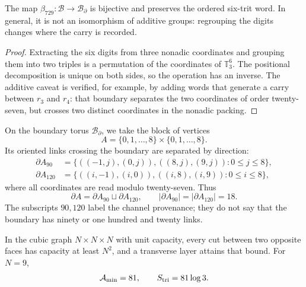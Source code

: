 \begin{proposition}
\label{rm:prop:modular-beta729}
The map \(\beta_{729}:\mathcal B\to\mathcal B_\partial\) is bijective and
preserves the ordered six-trit word. In general, it is not an
isomorphism of additive groups: regrouping the digits changes where the
carry is recorded.
\end{proposition}

\begin{proof}
Extracting the six digits from three nonadic coordinates and grouping them into
two triples is a permutation of the coordinates of \(\mathbb T_3^6\). The
positional decomposition is unique on both sides, so the
operation has an inverse. The additive caveat is verified, for example,
by adding words that generate a carry between \(r_3\) and \(r_4\): that
boundary separates the two coordinates of order twenty-seven, but crosses
two distinct coordinates in the nonadic packing.
\end{proof}

On the boundary torus \(\mathcal B_\partial\), we take the block of vertices
\begin{equation}
\label{rm:eq:modular-block-A}
A=\{0,1,\ldots,8\}\times\{0,1,\ldots,8\}.
\end{equation}
Its oriented links crossing the boundary are separated by direction:
\begin{align}
\partial A_{90}
&=\{((-1,j),(0,j)),((8,j),(9,j)):0\leq j\leq8\},
\label{rm:eq:modular-boundary90}\\
\partial A_{120}
&=\{((i,-1),(i,0)),((i,8),(i,9)):0\leq i\leq8\},
\label{rm:eq:modular-boundary120}
\end{align}
where all coordinates are read modulo twenty-seven. Thus
\begin{equation}
\label{rm:eq:modular-boundary-counts}
\partial A=\partial A_{90}\sqcup\partial A_{120},
\qquad
|\partial A_{90}|=|\partial A_{120}|=18.
\end{equation}
The subscripts \(90,120\) label the channel provenance; they do not say that
the boundary has ninety or one hundred and twenty links.

\begin{theorem}
\label{rm:thm:modular-triadic-cut}
In the cubic graph \(N\times N\times N\) with unit capacity, every
cut between two opposite faces has capacity at least \(N^2\), and a
transverse layer attains that bound. For \(N=9\),
\begin{equation}
\label{rm:eq:modular-mincut-entropy}
\mathcal A_{\min}=81,
\qquad
S_{\rm tri}=81\log3.
\end{equation}
\end{theorem}

